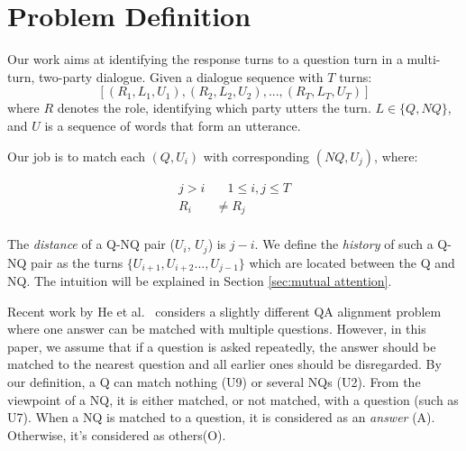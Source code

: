 \section{Problem Definition}
\label{sec:problem}
Our work aims at identifying the response turns to a question turn in a multi-turn,
two-party dialogue. Given a dialogue sequence with $T$ turns: 
$$[(R_1,L_1,U_1),(R_2,L_2,U_2),...,(R_T,L_T,U_T)]$$ 
where $R$ denotes the role, identifying which party utters
the turn. $L\in\{Q, NQ\}$, and $U$ is a sequence of words that form an utterance. 

Our job is to match each $(Q, U_i)$ with corresponding $(NQ, U_j)$, where:

\begin{equation}
\begin{aligned}
j>i&\quad 1\leq i,j\leq T\\
R_i&\not=R_j\\
\end{aligned}
\end{equation}

The {\em distance} of a Q-NQ pair ($U_i$, $U_j$) is $j-i$. We define
the {\em history} of such a Q-NQ pair as the turns 
$\{U_{i+1},U_{i+2}...,U_{j-1}\}$ which are located between the Q and NQ. The intuition will be explained in Section \ref{sec:mutual attention}.

Recent work by He et al.~\cite{he2019learning} considers a slightly different 
QA alignment problem where one answer can be matched with multiple questions. 
However, in this paper, we assume that if a question is asked repeatedly, the answer should be matched to 
the nearest question and all earlier ones should be disregarded. 
By our definition, a Q can match nothing (U9) or several NQs (U2). From the viewpoint of a NQ, it is 
either matched, or not matched, with a question (such as U7). When a NQ is matched to a question, it is 
considered as an {\em answer} (A). Otherwise, it's considered as others(O).



